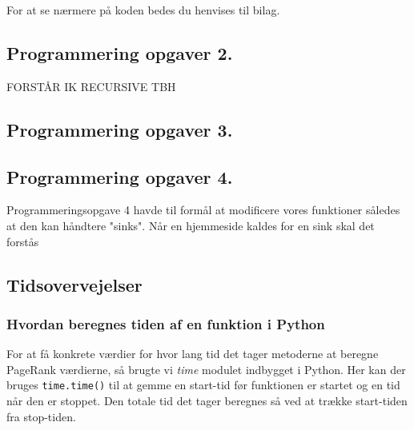 For at se nærmere på koden bedes du henvises til bilag.

\subsection*{Programmering opgaver 2.}

FORSTÅR IK RECURSIVE TBH

\subsection*{Programmering opgaver 3.}


\subsection*{Programmering opgaver 4.}
Programmeringsopgave 4 havde til formål at modificere vores funktioner således at den kan håndtere "sinks". Når en hjemmeside kaldes for en sink skal det forstås 

\subsection*{Tidsovervejelser}
\subsubsection*{Hvordan beregnes tiden af en funktion i Python}
For at få konkrete værdier for hvor lang tid det tager metoderne at beregne PageRank værdierne, så brugte vi \emph{time} modulet indbygget i Python. Her kan der bruges \texttt{time.time()} til at gemme en start-tid før funktionen er startet og en tid når den er stoppet. Den totale tid det tager beregnes så ved at trække start-tiden fra stop-tiden.

